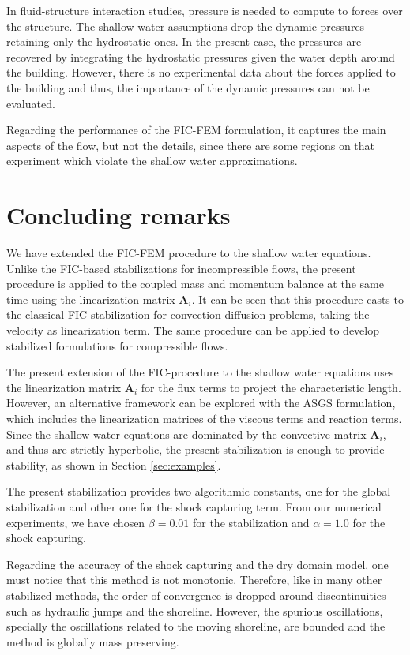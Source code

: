 \documentclass[a4paper,12pt]{elsarticle}
\begin{document}
In fluid-structure interaction studies, pressure is needed to compute to forces over the structure. The shallow water assumptions drop the dynamic pressures retaining only the hydrostatic ones. In the present case, the pressures are recovered by integrating the hydrostatic pressures given the water depth around the building. However, there is no experimental data about the forces applied to the building and thus, the importance of the dynamic pressures can not be evaluated.


Regarding the performance of the FIC-FEM formulation, it captures the main aspects of the flow, but not the details, since there are some regions on that experiment which violate the shallow water approximations.


\section{Concluding remarks} \label{sec:conclusions}

We have extended the FIC-FEM procedure to the shallow water equations. Unlike the FIC-based stabilizations for incompressible flows, the present procedure is applied to the coupled mass and momentum balance at the same time using the linearization matrix $\mathbf{A}_i$. It can be seen that this procedure casts to the classical FIC-stabilization for convection diffusion problems, taking the velocity as linearization term. The same procedure can be applied to develop stabilized formulations for compressible flows.

The present extension of the FIC-procedure to the shallow water equations uses the linearization matrix $\mathbf{A}_i$ for the flux terms to project the characteristic length. However, an alternative framework can be explored with the ASGS \cite{hughes1995,codina2008} formulation, which includes the linearization matrices of the viscous terms and reaction terms. Since the shallow water equations are dominated by the convective matrix $\mathbf{A}_i$, and thus are strictly hyperbolic, the present stabilization is enough to provide stability, as shown in Section \ref{sec:examples}.

The present stabilization provides two algorithmic constants, one for the global stabilization and other one for the shock capturing term. From our numerical experiments, we have chosen $\beta=0.01$ for the stabilization and $\alpha=1.0$ for the shock capturing.

Regarding the accuracy of the shock capturing and the dry domain model, one must notice that this method is not monotonic. Therefore, like in many other stabilized methods, the order of convergence is dropped around discontinuities such as hydraulic jumps and the shoreline. However, the spurious oscillations, specially the oscillations related to the moving shoreline, are bounded and the method is globally mass preserving.
\end{document}
